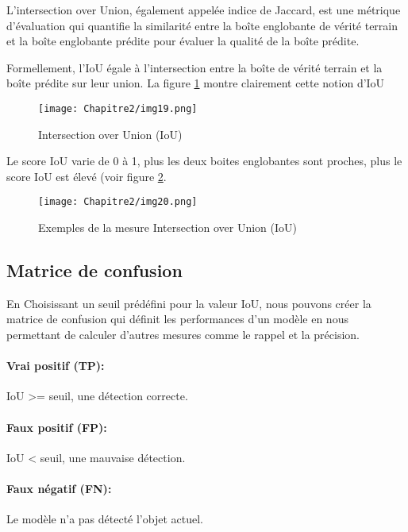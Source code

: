 L'intersection over Union, également appelée indice de Jaccard, est une métrique d'évaluation qui quantifie la similarité entre la boîte englobante de vérité terrain  et la boîte englobante prédite pour évaluer la qualité de la boîte prédite. 

Formellement, l'IoU égale à l'intersection entre la boîte de vérité terrain et la boîte prédite sur leur union. La figure \ref{img19} montre clairement cette notion d'IoU
          \begin{figure}[H]
               \centering
               \texttt{[image: Chapitre2/img19.png]}
               \caption{Intersection over Union (IoU)}
               \label{img19}
               \end{figure}

Le score IoU varie de 0 à 1, plus les deux boites englobantes sont proches, plus le score IoU est élevé (voir figure \ref{img20}.
          \begin{figure}[H]
               \centering
               \texttt{[image: Chapitre2/img20.png]}
               \caption{Exemples de la mesure Intersection over Union (IoU)}
               \label{img20}
               \end{figure}

\subsection{Matrice de confusion}

En Choisissant un seuil prédéfini pour la valeur IoU, nous pouvons créer la matrice de confusion qui définit les performances d'un modèle en nous permettant de calculer d'autres mesures comme le rappel et la précision.
          \paragraph{Vrai positif (TP):} IoU >= seuil, une détection correcte. 
          \paragraph{Faux positif (FP):} IoU < seuil, une mauvaise détection.
          \paragraph{Faux négatif (FN):} Le modèle n'a pas détecté l'objet actuel.
